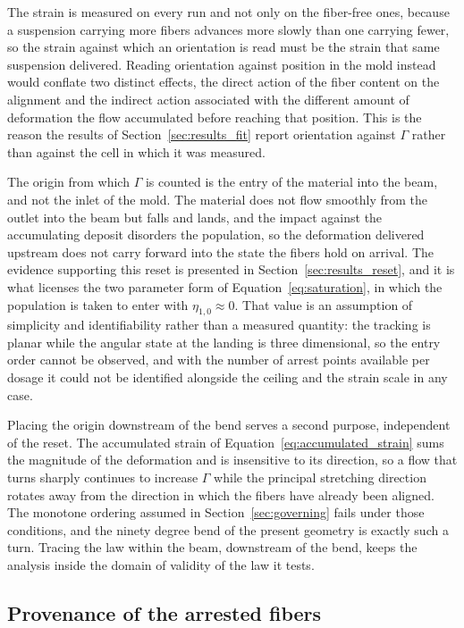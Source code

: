 \documentclass[%
  aip,
  pof,          %
  reprint,      %
  floatfix
]{revtex4-2}
\begin{document}
The strain is measured on every run and not only on the fiber-free ones, because a suspension carrying more fibers advances more slowly than one carrying fewer, so the strain against which an orientation is read must be the strain that same suspension delivered. Reading orientation against position in the mold instead would conflate two distinct effects, the direct action of the fiber content on the alignment and the indirect action associated with the different amount of deformation the flow accumulated before reaching that position. This is the reason the results of Section~\ref{sec:results_fit} report orientation against $\Gamma$ rather than against the cell in which it was measured.

The origin from which $\Gamma$ is counted is the entry of the material into the beam, and not the inlet of the mold. The material does not flow smoothly from the outlet into the beam but falls and lands, and the impact against the accumulating deposit disorders the population, so the deformation delivered upstream does not carry forward into the state the fibers hold on arrival. The evidence supporting this reset is presented in Section~\ref{sec:results_reset}, and it is what licenses the two parameter form of Equation~\eqref{eq:saturation}, in which the population is taken to enter with $\eta_{1,0}\approx 0$. That value is an assumption of simplicity and identifiability rather than a measured quantity: the tracking is planar while the angular state at the landing is three dimensional, so the entry order cannot be observed, and with the number of arrest points available per dosage it could not be identified alongside the ceiling and the strain scale in any case.

Placing the origin downstream of the bend serves a second purpose, independent of the reset. The accumulated strain of Equation~\eqref{eq:accumulated_strain} sums the magnitude of the deformation and is insensitive to its direction, so a flow that turns sharply continues to increase $\Gamma$ while the principal stretching direction rotates away from the direction in which the fibers have already been aligned. The monotone ordering assumed in Section~\ref{sec:governing} fails under those conditions, and the ninety degree bend of the present geometry is exactly such a turn. Tracing the law within the beam, downstream of the bend, keeps the analysis inside the domain of validity of the law it tests.

\subsection{Provenance of the arrested fibers}
\label{sec:framework_provenance}
\end{document}
